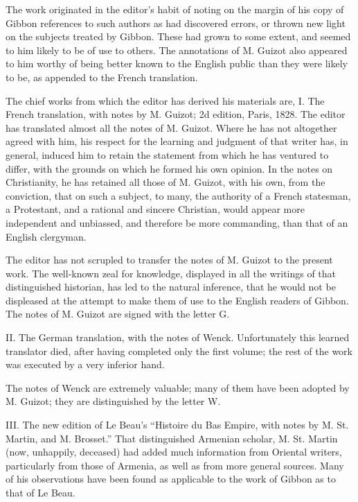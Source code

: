 The work originated in the editor’s habit of noting on the margin of his copy of Gibbon references to such authors as had discovered errors, or thrown new light on the subjects treated by Gibbon. These had grown to some extent, and seemed to him likely to be of use to others. The annotations of M. Guizot also appeared to him worthy of being better known to the English public than they were likely to be, as appended to the French translation.

The chief works from which the editor has derived his materials are, I. The French translation, with notes by M. Guizot; 2d edition, Paris, 1828. The editor has translated almost all the notes of M. Guizot. Where he has not altogether agreed with him, his respect for the learning and judgment of that writer has, in general, induced him to retain the statement from which he has ventured to differ, with the grounds on which he formed his own opinion. In the notes on Christianity, he has retained all those of M. Guizot, with his own, from the conviction, that on such a subject, to many, the authority of a French statesman, a Protestant, and a rational and sincere Christian, would appear more independent and unbiassed, and therefore be more commanding, than that of an English clergyman.

The editor has not scrupled to transfer the notes of M. Guizot to the present work. The well-known zeal for knowledge, displayed in all the writings of that distinguished historian, has led to the natural inference, that he would not be displeased at the attempt to make them of use to the English readers of Gibbon. The notes of M. Guizot are signed with the letter G.

II. The German translation, with the notes of Wenck. Unfortunately this learned translator died, after having completed only the first volume; the rest of the work was executed by a very inferior hand.

The notes of Wenck are extremely valuable; many of them have been adopted by M. Guizot; they are distinguished by the letter W.\footnotemark[102]


III. The new edition of Le Beau’s “Histoire du Bas Empire, with notes by M. St. Martin, and M. Brosset.” That distinguished Armenian scholar, M. St. Martin (now, unhappily, deceased) had added much information from Oriental writers, particularly from those of Armenia, as well as from more general sources. Many of his observations have been found as applicable to the work of Gibbon as to that of Le Beau.

